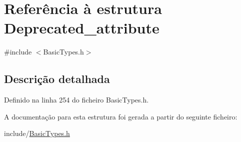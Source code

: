 \hypertarget{structDeprecated__attribute}{}\section{Referência à estrutura Deprecated\+\_\+attribute}
\label{structDeprecated__attribute}


{\ttfamily \#include $<$Basic\+Types.\+h$>$}



\subsection{Descrição detalhada}


Definido na linha 254 do ficheiro Basic\+Types.\+h.



A documentação para esta estrutura foi gerada a partir do seguinte ficheiro\+:\begin{DoxyCompactItemize}
\item 
include/\hyperlink{BasicTypes_8h}{Basic\+Types.\+h}\end{DoxyCompactItemize}

